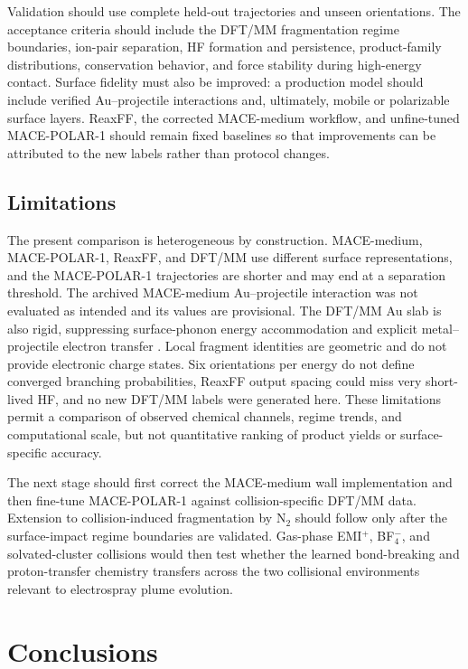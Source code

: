 \documentclass[preprint,review,12pt]{elsarticle}
\begin{document}
Validation should use complete held-out trajectories and unseen orientations.
The acceptance criteria should include the DFT/MM fragmentation regime
boundaries, ion-pair separation, HF formation and persistence, product-family
distributions, conservation behavior, and force stability during high-energy
contact. Surface fidelity must also be improved: a production model should
include verified Au--projectile interactions and, ultimately, mobile or
polarizable surface layers. ReaxFF, the corrected MACE-medium workflow, and
unfine-tuned MACE-POLAR-1 should remain fixed baselines so that improvements
can be attributed to the new labels rather than protocol changes.

\subsection{Limitations}
\label{sec:limitations}

The present comparison is heterogeneous by construction. MACE-medium,
MACE-POLAR-1, ReaxFF, and DFT/MM use different surface representations, and the
MACE-POLAR-1 trajectories are shorter and may end at a separation threshold.
The archived MACE-medium Au--projectile interaction was not evaluated as
intended and its values are provisional. The DFT/MM Au slab is also rigid,
suppressing surface-phonon energy accommodation and explicit
metal--projectile electron transfer \cite{Laws2026}. Local fragment identities
are geometric and do not provide electronic charge states. Six orientations
per energy do not define converged branching probabilities, ReaxFF output
spacing could miss very short-lived HF, and no new DFT/MM labels were
generated here. These limitations permit a comparison of observed chemical
channels, regime trends, and computational scale, but not quantitative ranking
of product yields or surface-specific accuracy.

The next stage should first correct the MACE-medium wall implementation and
then fine-tune MACE-POLAR-1 against collision-specific DFT/MM data. Extension
to collision-induced fragmentation by N$_2$ should follow only after the
surface-impact regime boundaries are validated. Gas-phase EMI$^+$, BF$_4^-$,
and solvated-cluster collisions would then test whether the learned
bond-breaking and proton-transfer chemistry transfers across the two
collisional environments relevant to electrospray plume evolution.

\section{Conclusions}
\label{sec:conclusions}
\end{document}
